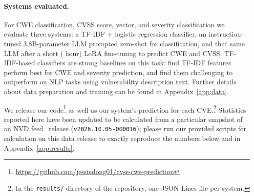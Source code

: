 \paragraph{Systems evaluated.}
For CWE classification, CVSS score, vector, and severity classification we evaluate three systems: a TF-IDF + logistic regression classifier, an instruction-tuned 3.8B-parameter LLM prompted zero-shot for classification, and that same LLM after a short (\nLoraTrainHours{} hour) LoRA fine-tuning to predict CWE and CVSS.
TF-IDF-based classifiers are strong baselines on this task: \citet{talibzade2025llms} find TF-IDF features perform best for CWE and severity prediction, and find them challenging to outperform on NLP tasks using vulnerability description text.
Further details about data preparation and training can be found in Appendix~\ref{app:data}.

We release our code\footnote{\url{https://github.com/jessiedong01/cvss-cwe-prediction}} as well as our system's prediction for each CVE.\footnote{In the \texttt{results/} directory of the repository, one JSON Lines file per system.}
Statistics reported here have been updated to be calculated from a particular snapshot of an NVD feed~\citep{fkie2026nvdfeeds} release (\texttt{v2026.10.05-000016}); please run our provided scripts for calculation on this data release to exactly reproduce the numbers below and in Appendix~\ref{app:results}.
